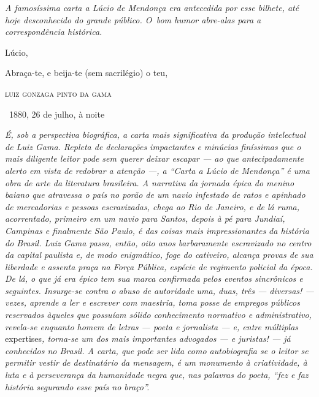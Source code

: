 
\begin{resumo}
\emph{A famosíssima carta a Lúcio de Mendonça era antecedida por esse
bilhete, até hoje desconhecido do grande público. O~bom humor abre-alas
para a correspondência histórica. }
\end{resumo}


Lúcio,

Abraça-te, e beija-te (sem sacrilégio) o teu,\medskip

\hfill\textsc{luiz gonzaga pinto da gama}

\hfill\ 1880, 26 de julho, à noite


\begin{resumo}
\emph{É, sob a perspectiva biográfica, a carta mais significativa da
produção intelectual de Luiz Gama. Repleta de declarações impactantes e
minúcias finíssimas que o mais diligente leitor pode sem querer deixar
escapar --- ao que antecipadamente alerto em vista de redobrar a atenção
---, a ``Carta a Lúcio de Mendonça'' é uma obra de arte da literatura
brasileira. A narrativa da jornada épica do menino baiano que atravessa
o país no porão de um navio infestado de ratos e apinhado de mercadorias
e pessoas escravizadas, chega ao Rio de Janeiro, e de lá ruma,
acorrentado, primeiro em um navio para Santos, depois à pé para Jundiaí,
Campinas e finalmente São Paulo, é das coisas mais impressionantes da
história do Brasil. Luiz Gama passa, então, oito anos barbaramente
escravizado no centro da capital paulista e, de modo enigmático, foge do
cativeiro, alcança provas de sua liberdade e assenta praça na Força
Pública, espécie de regimento policial da época. De lá, o que já era
épico tem sua marca confirmada pelos eventos sincrônicos e seguintes.
Insurge-se contra o abuso de autoridade uma, duas, três --- diversas! ---
vezes, aprende a ler e escrever com maestria, toma posse de empregos
públicos reservados àqueles que possuíam sólido conhecimento normativo e
administrativo, revela-se enquanto homem de letras --- poeta e jornalista
--- e, entre múltiplas} expertises\emph{, torna-se um dos mais importantes
advogados --- e juristas! --- já conhecidos no Brasil. A carta, que pode
ser lida como autobiografia se o leitor se permitir vestir de
destinatário da mensagem, é um monumento à criatividade, à luta e à
perseverança da humanidade negra que, nas palavras do poeta, ``fez e faz
história segurando esse país no braço''. }
\end{resumo}\pagebreak


